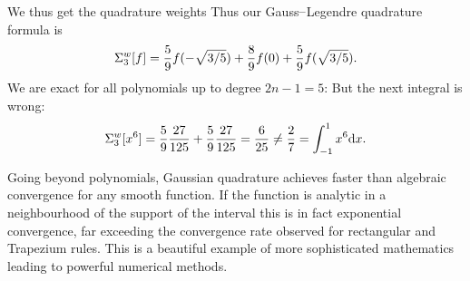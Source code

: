 \begin{example}
{}
We thus get the quadrature weights
Thus our Gauss\ensuremath{\endash}Legendre quadrature formula is
\[
\ensuremath{\Sigma}_3^w[f] = {5 \over 9} f(-\sqrt{3/5}) + {8 \over 9} f(0) + {5 \over 9} f(\sqrt{3/5}).
\]
We are exact for all polynomials up to degree $2n-1 = 5$:
But the next integral is wrong:
\[
\ensuremath{\Sigma}_3^w[x^6] = {5 \over 9} {27 \over 125} + {5 \over 9} {27 \over 125} = {6 \over 25} \ensuremath{\neq} {2 \over 7} = \ensuremath{\int}_{-1}^1 x^6 {\rm d}x.
\]
\end{example}

Going beyond polynomials,  Gaussian quadrature achieves faster than algebraic convergence for any smooth function.  If the function is analytic in a neighbourhood of the support of the interval this is in fact exponential convergence, far exceeding the convergence rate observed for rectangular and Trapezium rules.  This is a beautiful example of more sophisticated mathematics leading to powerful numerical methods. 



